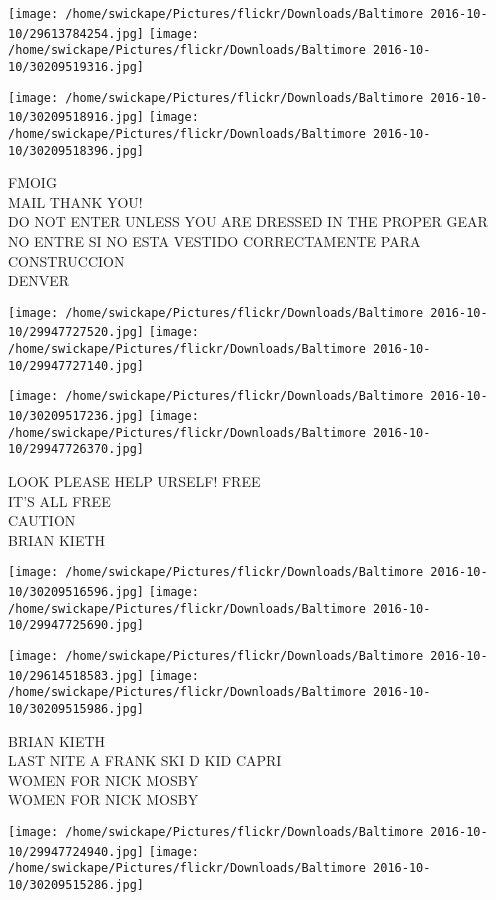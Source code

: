 \documentclass[10pt,letterpaper]{article}
\begin{document}
\texttt{[image: /home/swickape/Pictures/flickr/Downloads/Baltimore 2016-10-10/29613784254.jpg]}
\texttt{[image: /home/swickape/Pictures/flickr/Downloads/Baltimore 2016-10-10/30209519316.jpg]}

\texttt{[image: /home/swickape/Pictures/flickr/Downloads/Baltimore 2016-10-10/30209518916.jpg]}
\texttt{[image: /home/swickape/Pictures/flickr/Downloads/Baltimore 2016-10-10/30209518396.jpg]}

FMOIG\\
MAIL THANK YOU!\\
DO NOT ENTER UNLESS YOU ARE DRESSED IN THE PROPER GEAR NO ENTRE SI NO ESTA VESTIDO CORRECTAMENTE PARA CONSTRUCCION\\
DENVER
\pagebreak

\texttt{[image: /home/swickape/Pictures/flickr/Downloads/Baltimore 2016-10-10/29947727520.jpg]}
\texttt{[image: /home/swickape/Pictures/flickr/Downloads/Baltimore 2016-10-10/29947727140.jpg]}

\texttt{[image: /home/swickape/Pictures/flickr/Downloads/Baltimore 2016-10-10/30209517236.jpg]}
\texttt{[image: /home/swickape/Pictures/flickr/Downloads/Baltimore 2016-10-10/29947726370.jpg]}

LOOK PLEASE HELP URSELF!  FREE\\
IT'S ALL FREE\\
CAUTION\\
BRIAN KIETH
\pagebreak

\texttt{[image: /home/swickape/Pictures/flickr/Downloads/Baltimore 2016-10-10/30209516596.jpg]}
\texttt{[image: /home/swickape/Pictures/flickr/Downloads/Baltimore 2016-10-10/29947725690.jpg]}

\texttt{[image: /home/swickape/Pictures/flickr/Downloads/Baltimore 2016-10-10/29614518583.jpg]}
\texttt{[image: /home/swickape/Pictures/flickr/Downloads/Baltimore 2016-10-10/30209515986.jpg]}

BRIAN KIETH\\
LAST NITE A FRANK SKI D KID CAPRI\\
WOMEN FOR NICK MOSBY\\
WOMEN FOR NICK MOSBY
\pagebreak

\texttt{[image: /home/swickape/Pictures/flickr/Downloads/Baltimore 2016-10-10/29947724940.jpg]}
\texttt{[image: /home/swickape/Pictures/flickr/Downloads/Baltimore 2016-10-10/30209515286.jpg]}
\end{document}
